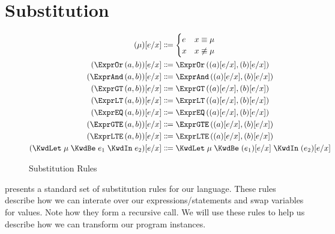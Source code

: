 \section{Substitution}\label{sec:substitution}

\begin{figure}[ht]
  \centering
\begin{align*}
  \subst{\mu}{e}{x}
  &
    \Coloneqq
    \begin{cases}
      e&x\equiv\mu\\
      x&x\not\equiv\mu\\
    \end{cases}
  \\
  \subst{\exprOr{a}{b}}{e}{x}&\Coloneqq\exprOr{\subst{a}{e}{x}}{\subst{b}{e}{x}}\\
  \subst{\exprAnd{a}{b}}{e}{x}&\Coloneqq\exprAnd{\subst{a}{e}{x}}{\subst{b}{e}{x}}\\
  \subst{\exprGT{a}{b}}{e}{x}&\Coloneqq\exprGT{\subst{a}{e}{x}}{\subst{b}{e}{x}}\\
  \subst{\exprLT{a}{b}}{e}{x}&\Coloneqq\exprLT{\subst{a}{e}{x}}{\subst{b}{e}{x}}\\
  \subst{\exprEQ{a}{b}}{e}{x}&\Coloneqq\exprEQ{\subst{a}{e}{x}}{\subst{b}{e}{x}}\\
  \subst{\exprGTE{a}{b}}{e}{x}&\Coloneqq\exprGTE{\subst{a}{e}{x}}{\subst{b}{e}{x}}\\
  \subst{\exprLTE{a}{b}}{e}{x}&\Coloneqq\exprLTE{\subst{a}{e}{x}}{\subst{b}{e}{x}}\\
  \subst{\stmtLet{\mu}{e_1}{e_2}}{e}{x}&\Coloneqq\stmtLet{\mu}{\subst{e_1}{e}{x}}{\subst{e_2}{e}{x}}
\end{align*}
  \caption{\label{fig:subst}Substitution Rules}
\end{figure}

 presents a standard set of substitution rules for our language.
These rules describe how we can interate over our expressions/statements and swap variables for values.
Note how they form a recursive call.
We will use these rules to help us describe how we can transform our program instances.
